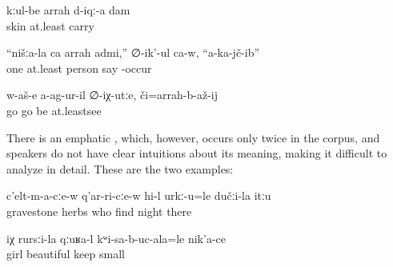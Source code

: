 \begin{exe}
	\ex	\label{ex:‎‎‎Give me at least the skin back minor}
	\gll	kːul-be	arrah	d-iqː-a	dam\\
		skin	at.least	carry	\\
	\glt	{}

	\ex	\label{ex:Of our (people) not even one man fell down, he says minor}
	\gll	``nišːa-la	ca	arrah	admi,''	∅-ik'-ul	ca-w,	``a-ka-jč-ib''\\
			one	at.least	person	say		-occur\\
	\glt	{}

	\ex	\label{ex:Let's go if you did not go there, at least to see minor}
	\gll	w-aš-e	a-ag-ur-il	∅-iχ-utːe,	či=arrah-b-až-ij\\
		go	go		be at.leastsee\\
	\glt	{}
\end{exe}

There is an emphatic  , which, however, occurs only twice in the corpus, and speakers do not have clear intuitions about its meaning, making it difficult to analyze in detail. These are the two examples:

\begin{exe}
	\ex	\label{ex:Among the graves, in the grass, who finds (him), at night minor}
	\gll	c'elt-m-a-cːe-w	q'ar-ri-cːe-w	hi-l	urkː-u=le	dučːi-la	itːu\\
		gravestone	herbs	who	find night	there\\
	\glt	{}

	\ex	\label{ex:‎(Look at) the way the girl is holding the child in her hands minor}
	\gll	iχ	rursːi-la qːuʁa-l	kʷi-sa-b-uc-ala=le	nik'a-ce\\
			girl	beautiful	keep	small\\
	\glt	{}
\end{exe}

